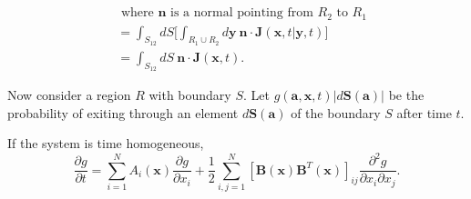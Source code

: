 \documentclass{article}
\newcommand{\mb}{\mathbf}
\begin{document}
\begin{pf}
\begin{align*}
\\ & \text{ where ${\mb n}$ is a normal pointing from $R_2$ to $R_1$}
\\&=\int_{S_{12}}dS\bigg[\int_{R_1\cup R_2}d{\mb y}\ {\mb n}\cdot \mb{J}({\mb x},t|{\mb y},t)\bigg]
\\&=\int_{S_{12}}dS\ {\mb n}\cdot {\mb J}({\mb x},t).
\end{align*}
\end{pf}

Now consider a region $R$ with boundary $S$.  Let $g({\mb a},{\mb x},t)|d{\mb S}({\mb a})|$ be the probability of exiting through an element $d{\mb S}({\mb a})$ of the boundary $S$ after time $t$.

\begin{claim}
If the system is time homogeneous, 
\begin{equation}
\frac{\partial g}{\partial t}=\sum_{i=1}^NA_i({\mb x})\frac{\partial g}{\partial x_i}+\frac{1}{2}\sum_{i,j=1}^N[{\mb B}({\mb x}){\mb B}^T({\mb x})]_{ij}\frac{\partial ^2 g}{\partial x_i\partial x_j}. \label{geq}
\end{equation}
\end{claim}
\end{document}
